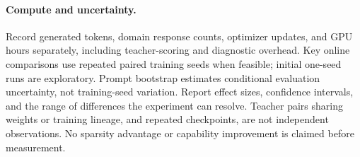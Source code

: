 \paragraph{Compute and uncertainty.}
Record generated tokens, domain response counts, optimizer updates, and
GPU hours separately, including teacher-scoring and diagnostic overhead.
Key online comparisons use repeated paired training seeds when feasible;
initial one-seed runs are exploratory. Prompt bootstrap estimates
conditional evaluation uncertainty, not training-seed variation.
Report effect sizes, confidence intervals, and the range of differences
the experiment can resolve. Teacher pairs sharing weights or training
lineage, and repeated checkpoints, are not independent observations.
No sparsity advantage or capability improvement is claimed before
measurement.
